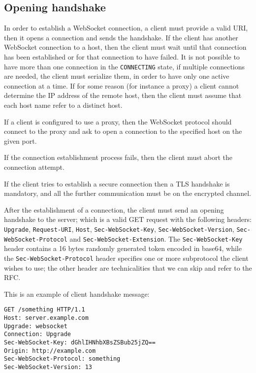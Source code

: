 \subsection{Opening handshake}
In order to establish a WebSocket connection, a client must provide a valid URI, then it opens a connection and sends the handshake.\newline
If the client has another WebSocket connection to a host, then the client must wait until that connection has been established or for that connection to have failed.\newline
It is not possible to have more than one connection in the \texttt{CONNECTING} state, if multiple connections are needed,
the client must serialize them, in order to have only one active connection at a time.\newline
If for some reason (for instance a proxy) a client cannot determine the IP address of the remote host,
then the client must assume that each host name refer to a distinct host.\newline

If a client is configured to use a proxy, then the WebSocket protocol should connect to the proxy and ask to open a connection to the specified host on the given port.\newline

If the connection establishment process fails, then the client must abort the connection attempt.\newline

If the client tries to establish a secure connection then a TLS handshake is mandatory, and all the further communication must be on the encrypted channel.\newline

After the establishment of a connection, the client must send an opening handshake to the server; which is a valid GET request with the following headers: \texttt{Upgrade}, \texttt{Request-URI}, \texttt{Host}, \texttt{Sec-WebSocket-Key}, \texttt{Sec-WebSocket-Version}, \texttt{Sec-WebSocket-Protocol} and \texttt{Sec-WebSocket-Extension}.\newline
The \texttt{Sec-WebSocket-Key} header contains a 16 bytes randomly generated token encoded in base64, while the \texttt{Sec-WebSocket-Protocol} header specifies one or more subprotocol the client wishes to use; the other header are technicalities that we can skip and refer to the RFC.

This is an example of client handshake message:
\begin{lstlisting}
GET /something HTTP/1.1
Host: server.example.com
Upgrade: websocket
Connection: Upgrade
Sec-WebSocket-Key: dGhlIHNhbXBsZSBub25jZQ==
Origin: http://example.com
Sec-WebSocket-Protocol: something
Sec-WebSocket-Version: 13
\end{lstlisting}

